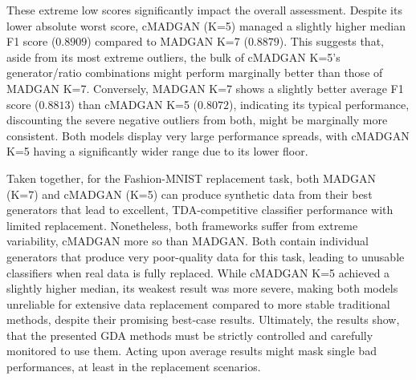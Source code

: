 These extreme low scores significantly impact the overall assessment. Despite its lower absolute worst score, cMADGAN (K=5) managed a slightly higher median F1 score ($0.8909$) compared to MADGAN K=7 ($0.8879$). This suggests that, aside from its most extreme outliers, the bulk of cMADGAN K=5's generator/ratio combinations might perform marginally better than those of MADGAN K=7. Conversely, MADGAN K=7 shows a slightly better average F1 score ($0.8813$) than cMADGAN K=5 ($0.8072$), indicating its typical performance, discounting the severe negative outliers from both, might be marginally more consistent. Both models display very large performance spreads, with cMADGAN K=5 having a significantly wider range due to its lower floor.

Taken together, for the Fashion-MNIST replacement task, both MADGAN (K=7) and cMADGAN (K=5) can produce synthetic data from their best generators that lead to excellent, TDA-competitive classifier performance with limited replacement. Nonetheless, both frameworks suffer from extreme variability, cMADGAN more so than MADGAN. Both contain individual generators that produce very poor-quality data for this task, leading to unusable classifiers when real data is fully replaced. While cMADGAN K=5 achieved a slightly higher median, its weakest result was more severe, making both models unreliable for extensive data replacement compared to more stable traditional methods, despite their promising best-case results. Ultimately, the results show, that the presented GDA methods must be strictly controlled and carefully monitored to use them. Acting upon average results might mask single bad performances, at least in the replacement scenarios. 



